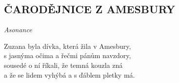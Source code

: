 \begin{flushleft}
    \section*{\Huge ČARODĚJNICE Z AMESBURY}
    \emph{Asonance}
\end{flushleft}

Zuzana byla dívka, která žila v Amesbury,\\
s jasnýma očima a řečmi pánům navzdory,\\
sousedé o ní říkali, že temná kouzla zná\\
a že se lidem vyhýbá a s ďáblem pletky má.\\

